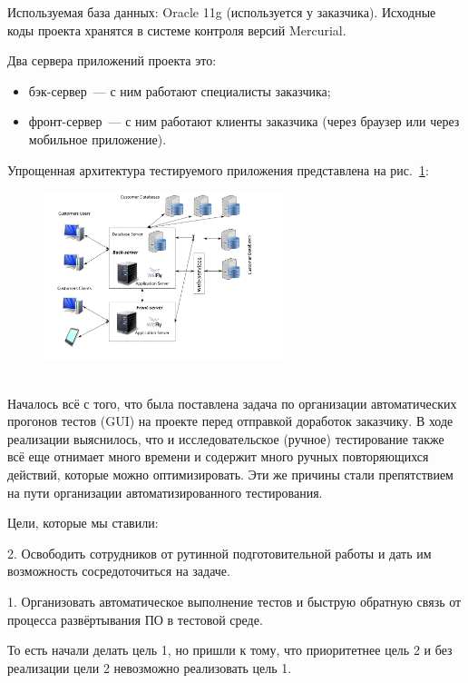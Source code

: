 \documentclass[10pt, a5paper]{article}
\begin{document}
Используемая база данных: Oracle 11g (используется у заказчика).
Исходные коды проекта хранятся в системе контроля версий Mercurial.

Два сервера приложений проекта это:

\begin{itemize}
  \item бэк-сервер~--- с ним работают специалисты заказчика;
  \item фронт-сервер~--- с ним работают клиенты заказчика (через браузер или через мобильное приложение).
\end{itemize}

Упрощенная архитектура тестируемого приложения представлена на рис.~\ref{Gagarin1}:

\begin{center}
\begin{figure}[h!]
  \centering
  \includegraphics[width=7cm]{13_2018_Gagarin1}
  \caption{~}
  \label{Gagarin1}
\end{figure}
\end{center} 

Началось всё с того, что была поставлена задача по организации автоматических прогонов тестов (GUI) на проекте перед отправкой доработок заказчику. В ходе реализации выяснилось, что и исследовательское (ручное) тестирование также всё еще отнимает много времени и содержит много ручных повторяющихся действий, которые можно оптимизировать. Эти же причины стали препятствием на пути организации автоматизированного тестирования.

Цели, которые мы ставили:

2. Освободить сотрудников от рутинной подготовительной работы и дать им возможность сосредоточиться на задаче.

1. Организовать автоматическое выполнение тестов и быструю обратную связь от процесса развёртывания ПО в тестовой среде.

То есть начали делать цель 1, но пришли к тому, что приоритетнее цель 2 и без реализации цели 2 невозможно реализовать цель 1.
\end{document}
